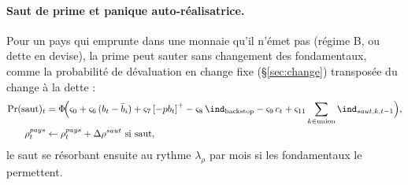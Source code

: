 \documentclass[11pt,a4paper]{article}
\newcommand{\pos}[1]{{\left[#1\right]^{+}}}
\begin{document}
\paragraph{Saut de prime et panique auto-réalisatrice.} Pour un pays qui emprunte dans une monnaie qu'il n'émet pas (régime B, ou dette en devise), la prime peut sauter sans changement des fondamentaux, comme la probabilité de dévaluation en change fixe (\S\ref{sec:change}) transposée du change à la dette :
\begin{equation}
\begin{split}
\Pr(\text{saut})_t &= \Phi\!\Big(\varsigma_0 + \varsigma_6\,(b_t - \bar b_i) + \varsigma_7\,\pos{-pb_t} - \varsigma_8\,\ind_{\text{backstop}} - \varsigma_9\, c_t + \varsigma_{11}\sum_{k\in\text{union}}\ind_{saut,k,t-1}\Big),\\
\rho^{pays}_t &\leftarrow \rho^{pays}_t + \Delta\rho^{saut} \ \text{si saut},
\end{split}
\label{eq:jump}
\end{equation}
le saut se résorbant ensuite au rythme $\lambda_\rho$ par mois si les fondamentaux le permettent.
\end{document}
